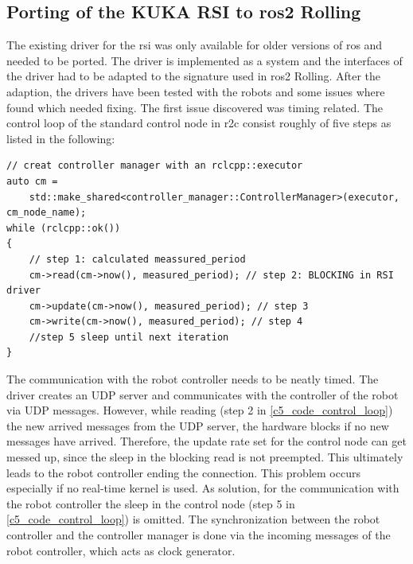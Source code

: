 \subsection{Porting of the KUKA RSI to \gls{ros2} Rolling}
The existing driver for the \gls{rsi} was only available for older versions of \gls{ros} and needed to be ported. 
The driver is implemented as a system and the interfaces of the driver had to be adapted to the signature used in \gls{ros2} Rolling. After the adaption, the drivers have been tested with the robots and some issues where found which needed fixing.\newline 
The first issue discovered was timing related. The control loop of the standard control node in \gls{r2c} consist roughly of five steps as listed in the following:\newline
\lstset{language=C++,basicstyle=\small}
\begin{lstlisting}[caption=Pseudo code for the control loop.,label=c5_code_control_loop]
// creat controller manager with an rclcpp::executor
auto cm = 
    std::make_shared<controller_manager::ControllerManager>(executor, cm_node_name);
while (rclcpp::ok())
{   
    // step 1: calculated meassured_period
    cm->read(cm->now(), measured_period); // step 2: BLOCKING in RSI driver
    cm->update(cm->now(), measured_period); // step 3
    cm->write(cm->now(), measured_period); // step 4
    //step 5 sleep until next iteration
}
\end{lstlisting}
The communication with the robot controller needs to be neatly timed. The driver creates an UDP server and communicates with the controller of the robot via UDP messages. However, while reading (step 2 in \autoref{c5_code_control_loop}) the new arrived messages from the UDP server, the hardware blocks if no new messages have arrived. Therefore, the update rate set for the control node can get messed up, since the sleep in the blocking read is not preempted. This ultimately leads to the robot controller ending the connection. This problem occurs especially if no real-time kernel is used.\newline
As solution, for the communication with the robot controller the sleep in the control node (step 5 in \autoref{c5_code_control_loop}) is omitted. The synchronization between the robot controller and the controller manager is done via the incoming messages of the robot controller, which acts as clock generator.

